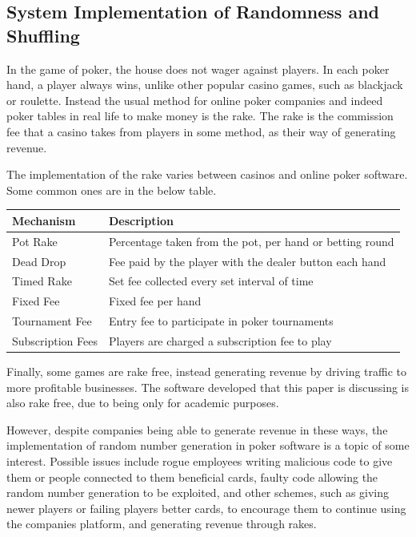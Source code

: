 \subsection{System Implementation of Randomness and Shuffling}
In the game of poker, the house does not wager against players. In each
poker hand, a player always wins, unlike other popular casino games, such as 
blackjack or roulette. Instead the usual method for online poker companies and
indeed poker tables in real life to make money is the rake. The rake is the 
commission fee that a casino takes from players in some method, as their way 
of generating revenue.

The implementation of the rake varies between casinos and online poker
software. Some common ones are in the below table.

\begin{center}
    \begin{tabular}{l l}
    \toprule
    Mechanism           & Description                                               \\
    \midrule
    Pot Rake            & Percentage taken from the pot, per hand or betting round  \\ \addlinespace
    Dead Drop           & Fee paid by the player with the dealer button each hand   \\ \addlinespace
    Timed Rake          & Set fee collected every set interval of time              \\ \addlinespace
    Fixed Fee           & Fixed fee per hand                                        \\ \addlinespace
    Tournament Fee      & Entry fee to participate in poker tournaments             \\ \addlinespace
    Subscription Fees   & Players are charged a subscription fee to play            \\
    \bottomrule
    \end{tabular}
\end{center}

Finally, some games are rake free, instead generating revenue by driving
traffic to more profitable businesses. The software developed that this paper
is discussing is also rake free, due to being only for academic purposes.

However, despite companies being able to generate revenue in these ways, the
implementation of random number generation in poker software is a topic of
some interest. Possible issues include rogue employees writing malicious
code to give them or people connected to them beneficial cards, faulty code
allowing the random number generation to be exploited, and other schemes, such
as giving newer players or failing players better cards, to encourage them to 
continue using the companies platform, and generating revenue through rakes.

